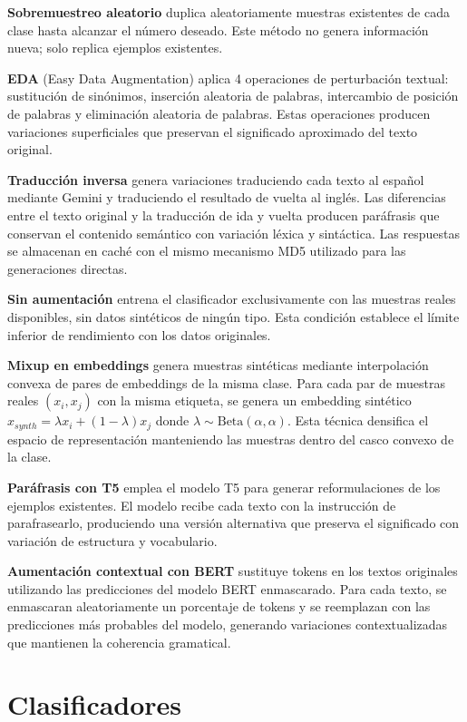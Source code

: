 \textbf{Sobremuestreo aleatorio} duplica aleatoriamente muestras existentes de cada clase hasta alcanzar el número deseado. Este método no genera información nueva; solo replica ejemplos existentes.

\textbf{EDA} (Easy Data Augmentation) aplica 4 operaciones de perturbación textual: sustitución de sinónimos, inserción aleatoria de palabras, intercambio de posición de palabras y eliminación aleatoria de palabras. Estas operaciones producen variaciones superficiales que preservan el significado aproximado del texto original.

\textbf{Traducción inversa} genera variaciones traduciendo cada texto al español mediante Gemini y traduciendo el resultado de vuelta al inglés. Las diferencias entre el texto original y la traducción de ida y vuelta producen paráfrasis que conservan el contenido semántico con variación léxica y sintáctica. Las respuestas se almacenan en caché con el mismo mecanismo MD5 utilizado para las generaciones directas.

\textbf{Sin aumentación} entrena el clasificador exclusivamente con las muestras reales disponibles, sin datos sintéticos de ningún tipo. Esta condición establece el límite inferior de rendimiento con los datos originales.

\textbf{Mixup en embeddings} genera muestras sintéticas mediante interpolación convexa de pares de embeddings de la misma clase. Para cada par de muestras reales $(x_i, x_j)$ con la misma etiqueta, se genera un embedding sintético $x_{synth} = \lambda x_i + (1-\lambda) x_j$ donde $\lambda \sim \text{Beta}(\alpha, \alpha)$. Esta técnica densifica el espacio de representación manteniendo las muestras dentro del casco convexo de la clase.

\textbf{Paráfrasis con T5} emplea el modelo T5 para generar reformulaciones de los ejemplos existentes. El modelo recibe cada texto con la instrucción de parafrasearlo, produciendo una versión alternativa que preserva el significado con variación de estructura y vocabulario.

\textbf{Aumentación contextual con BERT} sustituye tokens en los textos originales utilizando las predicciones del modelo BERT enmascarado. Para cada texto, se enmascaran aleatoriamente un porcentaje de tokens y se reemplazan con las predicciones más probables del modelo, generando variaciones contextualizadas que mantienen la coherencia gramatical.

\section{Clasificadores}
\label{sec:clasificadores}

